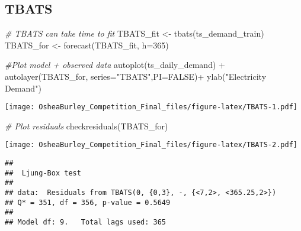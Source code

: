 \documentclass[
]{article}
\newenvironment{Shaded}{\begin{snugshade}}{\end{snugshade}}
\newcommand{\AttributeTok}[1]{\textcolor[rgb]{0.77,0.63,0.00}{#1}}
\newcommand{\CommentTok}[1]{\textcolor[rgb]{0.56,0.35,0.01}{\textit{#1}}}
\newcommand{\ConstantTok}[1]{\textcolor[rgb]{0.00,0.00,0.00}{#1}}
\newcommand{\DecValTok}[1]{\textcolor[rgb]{0.00,0.00,0.81}{#1}}
\newcommand{\FunctionTok}[1]{\textcolor[rgb]{0.00,0.00,0.00}{#1}}
\newcommand{\NormalTok}[1]{#1}
\newcommand{\OtherTok}[1]{\textcolor[rgb]{0.56,0.35,0.01}{#1}}
\newcommand{\SpecialCharTok}[1]{\textcolor[rgb]{0.00,0.00,0.00}{#1}}
\newcommand{\StringTok}[1]{\textcolor[rgb]{0.31,0.60,0.02}{#1}}
\begin{document}
\begin{Shaded}
\end{Shaded}

\hypertarget{tbats}{%
\subsection{TBATS}\label{tbats}}

\begin{Shaded}
\begin{Highlighting}[]
\CommentTok{\# TBATS can take time to fit}
\NormalTok{TBATS\_fit }\OtherTok{\textless{}{-}} \FunctionTok{tbats}\NormalTok{(ts\_demand\_train)}
\NormalTok{TBATS\_for }\OtherTok{\textless{}{-}} \FunctionTok{forecast}\NormalTok{(TBATS\_fit, }\AttributeTok{h=}\DecValTok{365}\NormalTok{)}

\CommentTok{\#Plot model + observed data}
\FunctionTok{autoplot}\NormalTok{(ts\_daily\_demand) }\SpecialCharTok{+}
  \FunctionTok{autolayer}\NormalTok{(TBATS\_for, }\AttributeTok{series=}\StringTok{"TBATS"}\NormalTok{,}\AttributeTok{PI=}\ConstantTok{FALSE}\NormalTok{)}\SpecialCharTok{+}
  \FunctionTok{ylab}\NormalTok{(}\StringTok{"Electricity Demand"}\NormalTok{) }
\end{Highlighting}
\end{Shaded}

\texttt{[image: OsheaBurley\_Competition\_Final\_files/figure-latex/TBATS-1.pdf]}

\begin{Shaded}
\begin{Highlighting}[]
\CommentTok{\# Plot residuals}
\FunctionTok{checkresiduals}\NormalTok{(TBATS\_for)}
\end{Highlighting}
\end{Shaded}

\texttt{[image: OsheaBurley\_Competition\_Final\_files/figure-latex/TBATS-2.pdf]}

\begin{verbatim}
## 
##  Ljung-Box test
## 
## data:  Residuals from TBATS(0, {0,3}, -, {<7,2>, <365.25,2>})
## Q* = 351, df = 356, p-value = 0.5649
## 
## Model df: 9.   Total lags used: 365
\end{verbatim}
\end{document}
